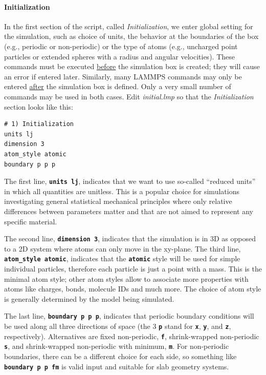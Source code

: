 \documentclass[9pt,tutorial]{livecoms}
\renewcommand{\emph}[1]{\underline{#1}}
\newcommand{\lmpcmd}[1]{\texttt{\normalsize\bfseries\textcolor{command}{#1}}}
\begin{document}
\paragraph{Initialization}

In the first section of the script, called \textit{Initialization}, we
enter global setting for the simulation, such as choice of units, the
behavior at the boundaries of the box (e.g., periodic or non-periodic)
or the type of atoms (e.g., uncharged point particles or extended
spheres with a radius and angular velocities).  These commands must be
executed \emph{before} the simulation box is created; they will cause an
error if entered later.  Similarly, many LAMMPS commands may only be
entered \emph{after} the simulation box is defined.  Only a very small
number of commands may be used in both cases.  Edit \textit{initial.lmp}
so that the \textit{Initialization} section looks like this:

\begin{lstlisting}
# 1) Initialization
units lj
dimension 3
atom_style atomic
boundary p p p
\end{lstlisting}

The first line, \lmpcmd{units lj}, indicates that we want to use
so-called ``reduced units'' in which all quantities are unitless.  This
is a popular choice for simulations investigating general statistical
mechanical principles where only relative differences between parameters
matter and that are not aimed to represent any specific material.

The second line, \lmpcmd{dimension 3}, indicates that the simulation is
in 3D as opposed to a 2D system where atoms can only move in the
xy-plane.  The third line, \lmpcmd{atom\_style atomic}, indicates that
the \lmpcmd{atomic} style will be used for simple individual particles,
therefore each particle is just a point with a mass.  This is the
minimal atom style; other atom styles allow to associate more properties
with atoms like charges, bonds, molecule IDs and much more.  The choice
of atom style is generally determined by the model being simulated.

The last line, \lmpcmd{boundary p p p}, indicates that periodic boundary
conditions will be used along all three directions of space (the 3
\lmpcmd{p} stand for \lmpcmd{x}, \lmpcmd{y}, and \lmpcmd{z},
respectively).  Alternatives are fixed non-periodic, \lmpcmd{f},
shrink-wrapped non-periodic \lmpcmd{s}, and shrink-wrapped non-periodic
with minimum, \lmpcmd{m}.  For non-periodic boundaries, there can be a
different choice for each side, so something like \lmpcmd{boundary p p
  fm} is valid input and suitable for slab geometry systems.
\end{document}
